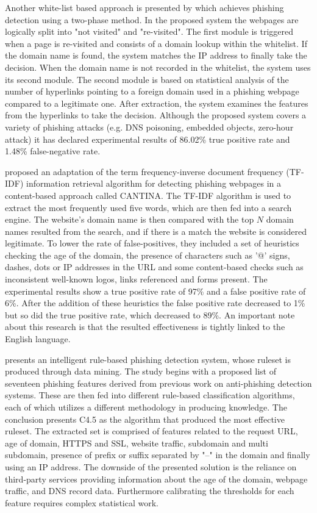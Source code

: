 Another white-list based approach is presented by \cite{ANTIPHISHING_AUTOUPDATED_WHITELIST} which achieves phishing detection using a two-phase method. In the proposed system the webpages are logically split into "not visited" and "re-visited". The first module is triggered when a page is re-visited and consists of a domain lookup within the whitelist. If the domain name is found, the system matches the IP address to finally take the decision. When the domain name is not recorded in the whitelist, the system uses its second module. The second module is based on statistical analysis of the number of hyperlinks pointing to a foreign domain used in a phishing webpage compared to a legitimate one. After extraction, the system examines the features from the hyperlinks to take the decision. Although the proposed system covers a variety of phishing attacks (e.g. DNS poisoning, embedded objects, zero-hour attack) it has declared experimental results of 86.02\% true positive rate and 1.48\% false-negative rate.

\cite{CANTINA} proposed an adaptation of the term frequency-inverse document frequency (TF-IDF) information retrieval algorithm for detecting phishing webpages in a content-based approach called CANTINA. The TF-IDF algorithm is used to extract the most frequently used five words, which are then fed into a search engine. The website's domain name is then compared with the top \(N\) domain names resulted from the search, and if there is a match the website is considered legitimate.
To lower the rate of false-positives, they included a set of heuristics checking the age of the domain, the presence of characters such as '@' signs, dashes, dots or IP addresses in the URL and some content-based checks such as inconsistent well-known logos, links referenced and forms present. The experimental results show a true positive rate of 97\% and a false positive rate of 6\%. After the addition of these heuristics the false positive rate decreased to 1\% but so did the true positive rate, which decreased to 89\%. An important note about this research is that the resulted effectiveness is tightly linked to the English language.

\cite{RULE_BASED_CLASSIFICATION} presents an intelligent rule-based phishing detection system, whose ruleset is produced through data mining. The study begins with a proposed list of seventeen phishing features derived from previous work on anti-phishing detection systems. These are then fed into different rule-based classification algorithms, each of which utilizes a different methodology in producing knowledge. The conclusion presents C4.5 \citep{C4.5} as the algorithm that produced the most effective ruleset. The extracted set is comprised of features related to the request URL, age of domain, HTTPS and SSL, website traffic, subdomain and multi subdomain, presence of prefix or suffix separated by "--" in the domain and finally using an IP address. The downside of the presented solution is the reliance on third-party services providing information about the age of the domain, webpage traffic, and DNS record data. Furthermore calibrating the thresholds for each feature requires complex statistical work.

